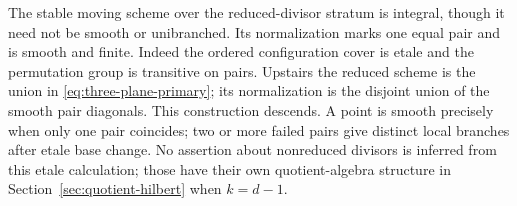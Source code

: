 The stable moving scheme over the reduced-divisor stratum is integral,
though it need not be smooth or unibranched. Its normalization marks
one equal pair and is smooth and finite. Indeed the ordered
configuration cover is etale and the permutation group is transitive
on pairs. Upstairs the reduced scheme is the union in
\eqref{eq:three-plane-primary}; its normalization is the disjoint
union of the smooth pair diagonals. This construction descends.
A point is smooth precisely when only one pair coincides; two or
more failed pairs give distinct local branches after etale base
change. No assertion about nonreduced divisors is inferred from this
etale calculation; those have their own quotient-algebra structure
in Section~\ref{sec:quotient-hilbert} when $k=d-1$.
